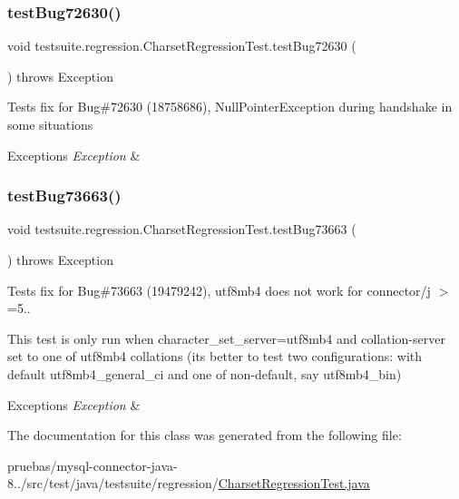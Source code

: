 \subsubsection{\texorpdfstring{test\+Bug72630()}{testBug72630()}}
{\footnotesize\ttfamily void testsuite.\+regression.\+Charset\+Regression\+Test.\+test\+Bug72630 (\begin{DoxyParamCaption}{ }\end{DoxyParamCaption}) throws Exception}

Tests fix for Bug\#72630 (18758686), Null\+Pointer\+Exception during handshake in some situations


\begin{DoxyExceptions}{Exceptions}
{\em Exception} & \\
\hline
\end{DoxyExceptions}
\mbox{\label{classtestsuite_1_1regression_1_1_charset_regression_test_a46c2702ffcbb3408a1b7fe21ba7b02d5}} 
\subsubsection{\texorpdfstring{test\+Bug73663()}{testBug73663()}}
{\footnotesize\ttfamily void testsuite.\+regression.\+Charset\+Regression\+Test.\+test\+Bug73663 (\begin{DoxyParamCaption}{ }\end{DoxyParamCaption}) throws Exception}

Tests fix for Bug\#73663 (19479242), utf8mb4 does not work for connector/j $>$=5..

This test is only run when character\+\_\+set\+\_\+server=utf8mb4 and collation-\/server set to one of utf8mb4 collations (it\textquotesingle{}s better to test two configurations\+: with default utf8mb4\+\_\+general\+\_\+ci and one of non-\/default, say utf8mb4\+\_\+bin)


\begin{DoxyExceptions}{Exceptions}
{\em Exception} & \\
\hline
\end{DoxyExceptions}


The documentation for this class was generated from the following file\+:\begin{DoxyCompactItemize}
\item 
pruebas/mysql-\/connector-\/java-\/8../src/test/java/testsuite/regression/\mbox{\hyperlink{_charset_regression_test_8java}{Charset\+Regression\+Test.\+java}}\end{DoxyCompactItemize}
